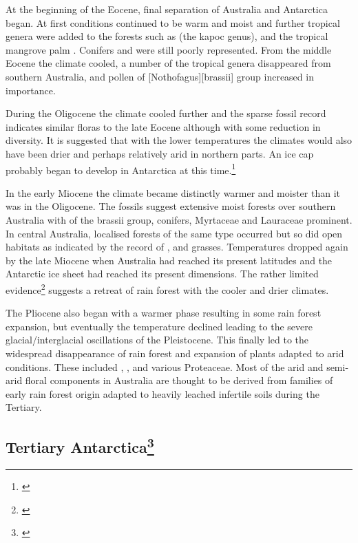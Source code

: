 At the beginning of the Eocene, final separation of Australia and Antarctica began.
At first conditions continued to be warm and moist and further tropical genera were added to the forests such as  (the kapoc genus), and the tropical mangrove palm .
Conifers and  were still poorly represented.
From the middle Eocene the climate cooled, a number of the tropical genera disappeared from southern Australia, and pollen of [Nothofagus][brassii] group increased in importance.

During the Oligocene the climate cooled further and the sparse fossil record indicates similar floras to the late Eocene although with some reduction in diversity.
It is suggested that with the lower temperatures the climates would also have been drier and perhaps relatively arid in northern parts.
An ice cap probably began to develop in Antarctica at this time.\footnote{\cite{kemp1978tertiary}}

In the early Miocene the climate became distinctly warmer and moister than it was in the Oligocene.
The fossils suggest extensive moist forests over southern Australia with  of the brassii group, conifers, Myrtaceae and Lauraceae prominent.
In central Australia, localised forests of the same type occurred but so did open habitats as indicated by the record of ,  and grasses.
Temperatures dropped again by the late Miocene when Australia had reached its present latitudes and the Antarctic ice sheet had reached its present dimensions.
The rather limited evidence\footnote{\cite{kemp1978tertiary}} suggests a retreat of rain forest with the cooler and drier climates.

The Pliocene also began with a warmer phase resulting in some rain forest expansion, but eventually the temperature declined leading to the severe glacial/interglacial oscillations of the Pleistocene.
This finally led to the widespread disappearance of rain forest and expansion of plants adapted to arid conditions.
These included , ,  and various Proteaceae.
Most of the arid and semi-arid floral components in Australia are thought to be derived from families of early rain forest origin adapted to heavily leached infertile soils during the Tertiary.

\subsection[Tertiary Antarctica]{Tertiary Antarctica\thinspace\footnote{\cite{wace1965vascular}}}

